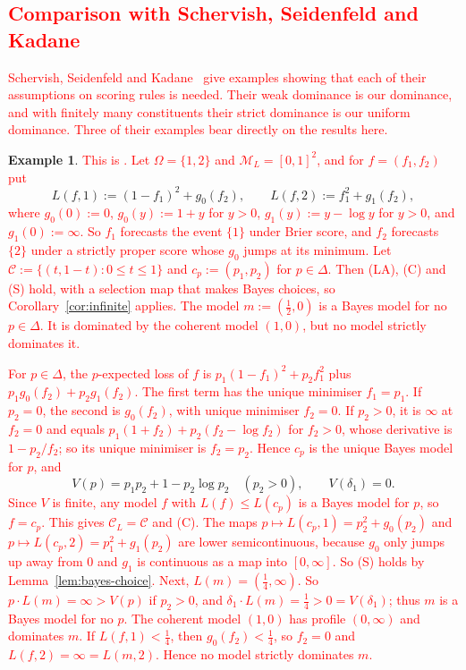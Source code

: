 \documentclass[11pt]{article}
\theoremstyle{definition}
\newtheorem{example}[theorem]{Example}
\theoremstyle{remark}
\newcommand{\M}{\mathcal M}
\newcommand{\C}{\mathcal C}
\begin{document}
\subsection{\textcolor{red}{Comparison with Schervish, Seidenfeld and Kadane}}\label{sec:ssk}
\textcolor{red}{Schervish, Seidenfeld and Kadane~\cite{SSK09} give examples showing that each of their assumptions on scoring rules is needed. Their weak dominance is our dominance, and with finitely many constituents their strict dominance is our uniform dominance. Three of their examples bear directly on the results here.}
\begin{example}\label{ex:ssk-sharp}
\textcolor{red}{This is \cite[Example~2]{SSK09}. Let $\Omega=\{1,2\}$ and $\M_L=[0,1]^2$, and for $f=(f_1,f_2)$ put}
\[
 L(f,1):=(1-f_1)^2+g_0(f_2),\qquad L(f,2):=f_1^2+g_1(f_2),
\]
\textcolor{red}{where $g_0(0):=0$, $g_0(y):=1+y$ for $y>0$, $g_1(y):=y-\log y$ for $y>0$, and $g_1(0):=\infty$. So $f_1$ forecasts the event $\{1\}$ under Brier score, and $f_2$ forecasts $\{2\}$ under a strictly proper score whose $g_0$ jumps at its minimum. Let $\C:=\{(t,1-t):0\le t\le1\}$ and $c_p:=(p_1,p_2)$ for $p\in\Delta$. Then (LA), (C) and (S) hold, with a selection map that makes Bayes choices, so Corollary~\ref{cor:infinite} applies. The model $m:=(\tfrac12,0)$ is a Bayes model for no $p\in\Delta$. It is dominated by the coherent model $(1,0)$, but no model strictly dominates it.}
\end{example}
\textcolor{red}{For $p\in\Delta$, the $p$-expected loss of $f$ is $p_1(1-f_1)^2+p_2f_1^2$ plus $p_1g_0(f_2)+p_2g_1(f_2)$. The first term has the unique minimiser $f_1=p_1$. If $p_2=0$, the second is $g_0(f_2)$, with unique minimiser $f_2=0$. If $p_2>0$, it is $\infty$ at $f_2=0$ and equals $p_1(1+f_2)+p_2(f_2-\log f_2)$ for $f_2>0$, whose derivative is $1-p_2/f_2$; so its unique minimiser is $f_2=p_2$. Hence $c_p$ is the unique Bayes model for $p$, and}
\[
 V(p)=p_1p_2+1-p_2\log p_2\quad(p_2>0),\qquad V(\delta_1)=0.
\]
\textcolor{red}{Since $V$ is finite, any model $f$ with $L(f)\le L(c_p)$ is a Bayes model for $p$, so $f=c_p$. This gives $\C_L=\C$ and (C). The maps $p\mapsto L(c_p,1)=p_2^2+g_0(p_2)$ and $p\mapsto L(c_p,2)=p_1^2+g_1(p_2)$ are lower semicontinuous, because $g_0$ only jumps up away from $0$ and $g_1$ is continuous as a map into $[0,\infty]$. So (S) holds by Lemma~\ref{lem:bayes-choice}. Next, $L(m)=(\tfrac14,\infty)$. So $p\cdot L(m)=\infty>V(p)$ if $p_2>0$, and $\delta_1\cdot L(m)=\tfrac14>0=V(\delta_1)$; thus $m$ is a Bayes model for no $p$. The coherent model $(1,0)$ has profile $(0,\infty)$ and dominates $m$. If $L(f,1)<\tfrac14$, then $g_0(f_2)<\tfrac14$, so $f_2=0$ and $L(f,2)=\infty=L(m,2)$. Hence no model strictly dominates $m$.}
\end{document}
